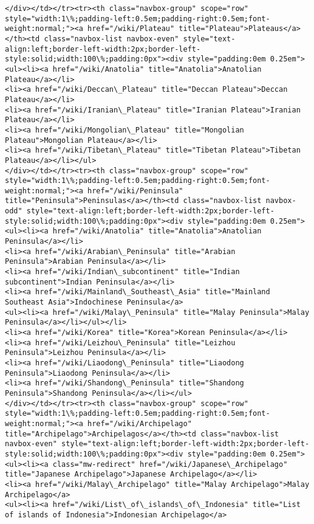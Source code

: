 \documentclass[11pt]{article}
\begin{document}
\begin{Verbatim}[commandchars=\\\{\}]
</div></td></tr><tr><th class="navbox-group" scope="row" style="width:1\%;padding-left:0.5em;padding-right:0.5em;font-weight:normal;"><a href="/wiki/Plateau" title="Plateau">Plateaus</a></th><td class="navbox-list navbox-even" style="text-align:left;border-left-width:2px;border-left-style:solid;width:100\%;padding:0px"><div style="padding:0em 0.25em">
<ul><li><a href="/wiki/Anatolia" title="Anatolia">Anatolian Plateau</a></li>
<li><a href="/wiki/Deccan\_Plateau" title="Deccan Plateau">Deccan Plateau</a></li>
<li><a href="/wiki/Iranian\_Plateau" title="Iranian Plateau">Iranian Plateau</a></li>
<li><a href="/wiki/Mongolian\_Plateau" title="Mongolian Plateau">Mongolian Plateau</a></li>
<li><a href="/wiki/Tibetan\_Plateau" title="Tibetan Plateau">Tibetan Plateau</a></li></ul>
</div></td></tr><tr><th class="navbox-group" scope="row" style="width:1\%;padding-left:0.5em;padding-right:0.5em;font-weight:normal;"><a href="/wiki/Peninsula" title="Peninsula">Peninsulas</a></th><td class="navbox-list navbox-odd" style="text-align:left;border-left-width:2px;border-left-style:solid;width:100\%;padding:0px"><div style="padding:0em 0.25em">
<ul><li><a href="/wiki/Anatolia" title="Anatolia">Anatolian Peninsula</a></li>
<li><a href="/wiki/Arabian\_Peninsula" title="Arabian Peninsula">Arabian Peninsula</a></li>
<li><a href="/wiki/Indian\_subcontinent" title="Indian subcontinent">Indian Peninsula</a></li>
<li><a href="/wiki/Mainland\_Southeast\_Asia" title="Mainland Southeast Asia">Indochinese Peninsula</a>
<ul><li><a href="/wiki/Malay\_Peninsula" title="Malay Peninsula">Malay Peninsula</a></li></ul></li>
<li><a href="/wiki/Korea" title="Korea">Korean Peninsula</a></li>
<li><a href="/wiki/Leizhou\_Peninsula" title="Leizhou Peninsula">Leizhou Peninsula</a></li>
<li><a href="/wiki/Liaodong\_Peninsula" title="Liaodong Peninsula">Liaodong Peninsula</a></li>
<li><a href="/wiki/Shandong\_Peninsula" title="Shandong Peninsula">Shandong Peninsula</a></li></ul>
</div></td></tr><tr><th class="navbox-group" scope="row" style="width:1\%;padding-left:0.5em;padding-right:0.5em;font-weight:normal;"><a href="/wiki/Archipelago" title="Archipelago">Archipelagos</a></th><td class="navbox-list navbox-even" style="text-align:left;border-left-width:2px;border-left-style:solid;width:100\%;padding:0px"><div style="padding:0em 0.25em">
<ul><li><a class="mw-redirect" href="/wiki/Japanese\_Archipelago" title="Japanese Archipelago">Japanese Archipelago</a></li>
<li><a href="/wiki/Malay\_Archipelago" title="Malay Archipelago">Malay Archipelago</a>
<ul><li><a href="/wiki/List\_of\_islands\_of\_Indonesia" title="List of islands of Indonesia">Indonesian Archipelago</a>

\end{Verbatim}
\end{document}
